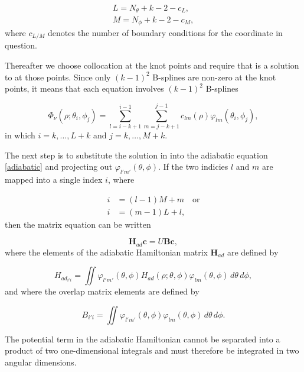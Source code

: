 \begin{align}
L = N_{\theta}+k-2-c_L,\\
M = N_{\phi}+k-2-c_M,
\end{align}
where $c_{L/M}$ denotes the number of boundary conditions for the coordinate in question.

Thereafter we choose collocation at the knot points and require that  is a solution to  at those points. Since only $(k-1)^2$ B-splines are non-zero at the knot points, it means that each equation involves $(k-1)^2$ B-splines

\begin{equation}
\Phi_{\nu}(\rho;\theta_i,\phi_j) = \sum_{l=i-k+1}^{i-1}\sum_{m=j-k+1}^{j-1} c_{lm}(\rho)\varphi_{lm} (\theta_{i},\phi_{j}),
\end{equation}
in which $i = k,\ldots,L+k$ and $j = k,\ldots,M+k$.

The next step is to substitute the solution in  into the adiabatic equation \eqref{adiabatic} and projecting out $\varphi_{l'm'}(\theta,\phi)$. If the two indicies $l$ and $m$ are mapped into a single index $i$, where

\begin{equation}
\begin{aligned}
i &= (l-1)M+m \quad \text{or}\\
i &= (m-1)L+l,
\end{aligned}
\end{equation} 
then the matrix equation can be written

\begin{equation}\label{generalized}
\mathbf{H}_{ad}\mathbf{c} = U\mathbf{B}\mathbf{c},
\end{equation}
where the elements of the adiabatic Hamiltonian matrix $\mathbf{H}_{ad}$ are defined by

\begin{equation}\label{ham_mat}
H_{ad_{i'i}} = \iint \varphi_{l'm'}(\theta,\phi) H_{ad}(\rho;\theta,\phi)\varphi_{lm}(\theta,\phi) \,d\theta\,d\phi,
\end{equation}
and where the overlap matrix elements are defined by

\begin{equation}\label{over_mat}
B_{i'i} = \iint \varphi_{l'm'}(\theta,\phi)\varphi_{lm}(\theta,\phi)\,d\theta\,d\phi.
\end{equation}

The potential term in the adiabatic Hamiltonian cannot be separated into a product of two one-dimensional integrals and must therefore be integrated in two angular dimensions. 

